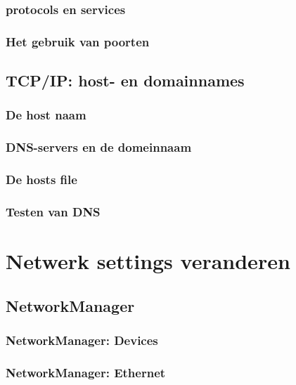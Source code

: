 \documentclass[a4paper,12pt,twoside,openright,titlepage]{book}
\begin{document}
\subsection{protocols en services}

%
\subsection{Het gebruik van poorten}


\section{TCP/IP: host- en domainnames}
\subsection{De host naam}

\subsection{DNS-servers en de domeinnaam}

\subsection{De hosts file}

\subsection{Testen van DNS}


\chapter{Netwerk settings veranderen}


\section{NetworkManager}

\subsection{NetworkManager: Devices}

\subsection{NetworkManager: Ethernet}

\end{document}
